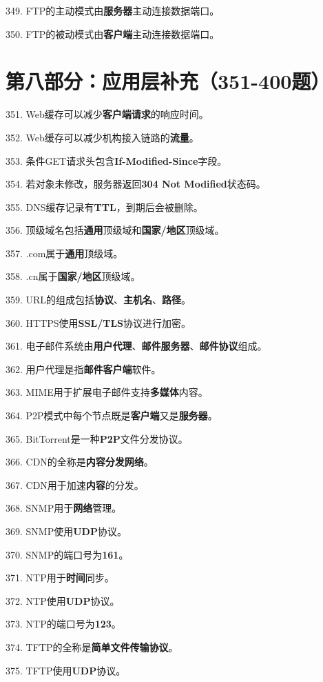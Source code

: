 \documentclass[12pt,a4paper,openany]{ctexbook}
\begin{document}
349. FTP的主动模式由\textbf{服务器}主动连接数据端口。

350. FTP的被动模式由\textbf{客户端}主动连接数据端口。

\section{第八部分：应用层补充（351-400题）}

351. Web缓存可以减少\textbf{客户端请求}的响应时间。

352. Web缓存可以减少机构接入链路的\textbf{流量}。

353. 条件GET请求头包含\textbf{If-Modified-Since}字段。

354. 若对象未修改，服务器返回\textbf{304 Not Modified}状态码。

355. DNS缓存记录有\textbf{TTL}，到期后会被删除。

356. 顶级域名包括\textbf{通用}顶级域和\textbf{国家/地区}顶级域。

357. .com属于\textbf{通用}顶级域。

358. .cn属于\textbf{国家/地区}顶级域。

359. URL的组成包括\textbf{协议}、\textbf{主机名}、\textbf{路径}。

360. HTTPS使用\textbf{SSL/TLS}协议进行加密。

361. 电子邮件系统由\textbf{用户代理}、\textbf{邮件服务器}、\textbf{邮件协议}组成。

362. 用户代理是指\textbf{邮件客户端}软件。

363. MIME用于扩展电子邮件支持\textbf{多媒体}内容。

364. P2P模式中每个节点既是\textbf{客户端}又是\textbf{服务器}。

365. BitTorrent是一种\textbf{P2P}文件分发协议。

366. CDN的全称是\textbf{内容分发网络}。

367. CDN用于加速\textbf{内容}的分发。

368. SNMP用于\textbf{网络}管理。

369. SNMP使用\textbf{UDP}协议。

370. SNMP的端口号为\textbf{161}。

371. NTP用于\textbf{时间}同步。

372. NTP使用\textbf{UDP}协议。

373. NTP的端口号为\textbf{123}。

374. TFTP的全称是\textbf{简单文件传输协议}。

375. TFTP使用\textbf{UDP}协议。
\end{document}
